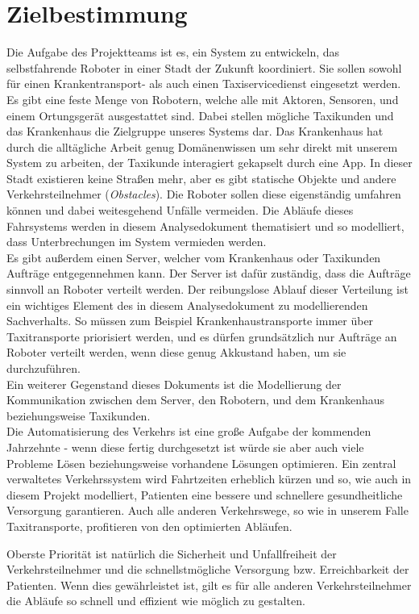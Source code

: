 
\section{Zielbestimmung}
Die Aufgabe des Projektteams ist es, ein System zu entwickeln, das selbstfahrende Roboter in einer Stadt der Zukunft koordiniert. 
Sie sollen sowohl für einen Krankentransport- als auch einen Taxiservicedienst eingesetzt werden. \\
Es gibt eine feste Menge von Robotern, welche alle mit Aktoren, Sensoren, und einem Ortungsgerät ausgestattet sind. Dabei stellen mögliche Taxikunden und das Krankenhaus die Zielgruppe unseres Systems dar. 
Das Krankenhaus hat durch die alltägliche Arbeit genug Domänenwissen um sehr direkt mit unserem System zu arbeiten, der Taxikunde interagiert gekapselt durch eine App.
In dieser Stadt existieren keine Straßen mehr, aber es gibt statische Objekte und andere Verkehrsteilnehmer (\textit{Obstacles}). 
Die Roboter sollen diese  eigenständig umfahren können und dabei weitesgehend Unfälle vermeiden. 
Die Abläufe dieses Fahrsystems werden in diesem Analysedokument thematisiert und so modelliert, dass Unterbrechungen im System vermieden werden.\\ 
Es gibt außerdem einen Server, welcher vom Krankenhaus oder Taxikunden Aufträge entgegennehmen kann. 
Der Server ist dafür zuständig, dass die Aufträge sinnvoll an Roboter verteilt werden. 
Der reibungslose Ablauf dieser Verteilung ist ein wichtiges Element des in diesem Analysedokument zu modellierenden Sachverhalts. 
So müssen zum Beispiel Krankenhaustransporte immer über Taxitransporte priorisiert werden, und es dürfen grundsätzlich nur Aufträge an Roboter verteilt werden, wenn diese genug Akkustand haben, um sie durchzuführen.\\
Ein weiterer Gegenstand dieses Dokuments ist die Modellierung der Kommunikation zwischen dem Server, den Robotern, und dem Krankenhaus beziehungsweise Taxikunden.\\

Die Automatisierung des Verkehrs ist eine große Aufgabe der kommenden Jahrzehnte - wenn diese fertig durchgesetzt ist würde sie aber auch viele Probleme Lösen beziehungsweise vorhandene Lösungen optimieren. Ein zentral verwaltetes Verkehrssystem wird Fahrtzeiten erheblich kürzen und so, wie auch in diesem Projekt modelliert, Patienten eine bessere und schnellere gesundheitliche Versorgung garantieren. Auch alle anderen Verkehrswege, so wie in unserem Falle Taxitransporte, profitieren von den optimierten Abläufen.

Oberste Priorität ist natürlich die Sicherheit und Unfallfreiheit der Verkehrsteilnehmer und die schnellstmögliche Versorgung bzw. Erreichbarkeit der Patienten. Wenn dies gewährleistet ist, gilt es für alle anderen Verkehrsteilnehmer die Abläufe so schnell und effizient wie möglich zu gestalten.\\


\pagebreak
